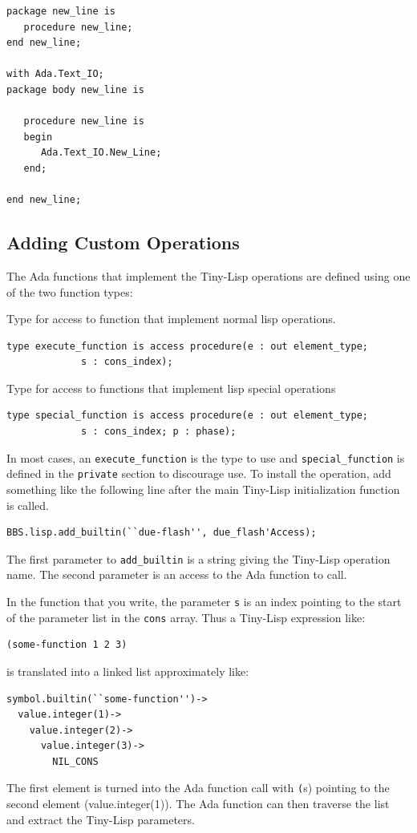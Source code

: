 \documentclass[10pt, openany]{book}
\newcommand{\keyword}[1]{\texttt{#1}}
\newcommand{\datatype}[1]{\texttt{#1}}
\newcommand{\tl}{Tiny-Lisp}
\begin{document}
\begin{lstlisting}
package new_line is
   procedure new_line;
end new_line;

with Ada.Text_IO;
package body new_line is

   procedure new_line is
   begin
      Ada.Text_IO.New_Line;
   end;

end new_line;
\end{lstlisting}

\subsection{Adding Custom Operations}
The Ada functions that implement the \tl{} operations are defined using one of the two function types:

Type for access to function that implement normal lisp operations.
\begin{lstlisting}
type execute_function is access procedure(e : out element_type;
             s : cons_index);
\end{lstlisting}
Type for access to functions that implement lisp special operations
\begin{lstlisting}
type special_function is access procedure(e : out element_type;
             s : cons_index; p : phase);
\end{lstlisting}
In most cases, an \datatype{execute\_function} is the type to use and \datatype{special\_function} is defined in the \keyword{private} section to discourage use.  To install the operation, add something like the following line after the main \tl{} initialization function is called.
\begin{lstlisting}
BBS.lisp.add_builtin(``due-flash'', due_flash'Access);
\end{lstlisting}
The first parameter to \keyword{add\_builtin} is a string giving the \tl{} operation name.  The second parameter is an access to the Ada function to call.

In the function that you write, the parameter \keyword{s} is an index pointing to the start of the parameter list in the \datatype{cons} array.  Thus a \tl{} expression like:
\lstset{language=[Tiny]Lisp}
\begin{lstlisting}
(some-function 1 2 3)
\end{lstlisting}
is translated into a linked list approximately like:
\begin{lstlisting}
symbol.builtin(``some-function'')->
  value.integer(1)->
    value.integer(2)->
      value.integer(3)->
        NIL_CONS
\end{lstlisting}
The first element is turned into the Ada function call with \keyword(s) pointing to the second element (value.integer(1)).  The Ada function can then traverse the list and extract the \tl{} parameters.
\lstset{language=Ada}
\end{document}
